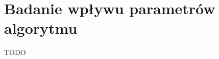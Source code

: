 \documentclass[skorowidz,skroty]{dyplomWEZUT}
\begin{document}
\section{Badanie wpływu parametrów algorytmu}



\FloatBarrier
\begin{zakonczenie}\label{chap:zakonczenie}
TODO
\end{zakonczenie}

\printbibliography[heading=bibintoc]

\listoftables

\listoffigures

\listoflistings


\printindex
\end{document}
